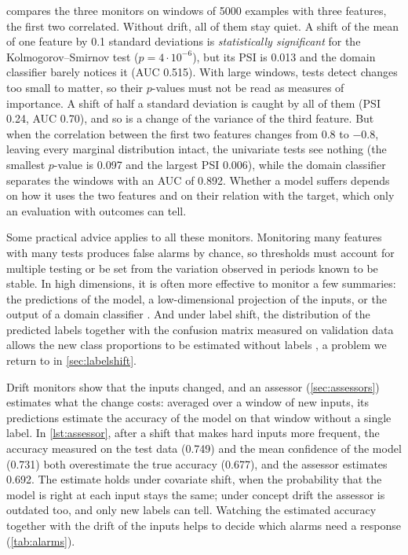  compares the three monitors on windows of 5000 examples with three features, the first two
correlated. Without drift, all of them stay quiet. A shift of the mean of one feature by 0.1 standard deviations
is \emph{statistically significant} for the Kolmogorov--Smirnov test ($p=4\cdot10^{-6}$), but its PSI is 0.013 and
the domain classifier barely notices it (AUC 0.515). With large windows, tests detect changes too small to
matter, so their $p$-values must not be read as measures of importance. A shift of half a standard deviation is
caught by all of them (PSI 0.24, AUC 0.70), and so is a change of the variance of the third feature. But when the
correlation between the first two features changes from 0.8 to $-0.8$, leaving every marginal distribution
intact, the univariate tests see nothing (the smallest $p$-value is 0.097 and the largest PSI 0.006), while the
domain classifier separates the windows with an AUC of 0.892. Whether a model suffers depends on how it uses the
two features and on their relation with the target, which only an evaluation with outcomes can tell.

Some practical advice applies to all these monitors. Monitoring many features with many tests produces false
alarms by chance, so thresholds must account for multiple testing or be set from the variation observed in
periods known to be stable. In high dimensions, it is often more effective to monitor a few summaries: the
predictions of the model, a low-dimensional projection of the inputs, or the output of a domain classifier
\citep{rabanser2019failing}. And under label shift, the distribution of the predicted labels together with the
confusion matrix measured on validation data allows the new class proportions to be estimated without labels
\citep{lipton2018detecting}, a problem we return to in \cref{sec:labelshift}.

\begin{further}
Drift monitors show that the inputs changed, and an assessor (\cref{sec:assessors})
estimates what the change costs: averaged over a window of new inputs, its predictions estimate the
accuracy of the model on that window without a single label. In \cref{lst:assessor}, after a shift
that makes hard inputs more frequent, the accuracy measured on the test data (0.749) and the mean
confidence of the model (0.731) both overestimate the true accuracy (0.677), and the assessor
estimates 0.692. The estimate holds under covariate shift, when the probability
that the model is right at each input stays the same; under concept drift the
assessor is outdated too, and only new labels can tell. Watching the estimated accuracy together
with the drift of the inputs helps to decide which alarms need a response (\cref{tab:alarms}).
\end{further}

